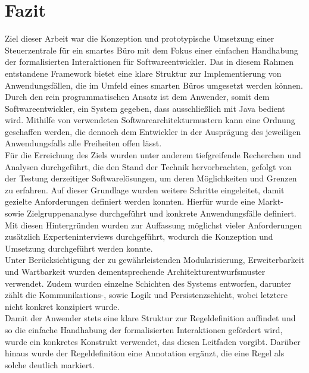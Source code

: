\chapter{Fazit}
\label{chap:fazit}
    Ziel dieser Arbeit war die Konzeption und prototypische Umsetzung einer Steuerzentrale für ein 
    smartes Büro mit dem Fokus einer einfachen Handhabung der formalisierten Interaktionen für Softwareentwickler. 
    Das in diesem Rahmen entstandene Framework bietet eine klare Struktur zur Implementierung von Anwendungsfällen, die 
    im Umfeld eines smarten Büros umgesetzt werden können. Durch den rein programmatischen Ansatz ist dem Anwender, somit 
    dem Softwareentwickler, ein System gegeben, dass ausschließlich mit Java bedient wird. Mithilfe von verwendeten 
    Softwarearchitekturmustern kann eine Ordnung geschaffen werden, die dennoch dem Entwickler in der 
    Ausprägung des jeweiligen Anwendungsfalls alle Freiheiten offen lässt. 
    \\
    \linebreak 
    Für die Erreichung des Ziels wurden unter anderem tiefgreifende Recherchen und Analysen durchgeführt, die den Stand 
    der Technik hervorbrachten, gefolgt von der Testung derzeitiger Softwarelösungen, um deren Möglichkeiten und Grenzen zu erfahren. 
    Auf dieser Grundlage wurden weitere Schritte eingeleitet, damit gezielte Anforderungen definiert werden konnten. Hierfür wurde 
    eine Markt- sowie Zielgruppenanalyse durchgeführt und konkrete Anwendungsfälle definiert. Mit diesen Hintergründen wurden zur 
    Auffassung möglichst vieler Anforderungen zusätzlich Experteninterviews durchgeführt, wodurch die Konzeption und Umsetzung 
    durchgeführt werden konnte. 
    \\
    \linebreak
    Unter Berücksichtigung der zu gewährleistenden Modularisierung, Erweiterbarkeit und Wartbarkeit wurden dementsprechende 
    Architekturentwurfsmuster verwendet. Zudem wurden einzelne Schichten des Systems entworfen, darunter zählt die Kommunikations-, sowie 
    Logik und Persistenzschicht, wobei letztere nicht konkret konzipiert wurde.     
    \\
    Damit der Anwender stets eine klare Struktur zur Regeldefinition auffindet und so die einfache Handhabung der formalisierten Interaktionen gefördert wird, wurde 
    ein konkretes Konstrukt verwendet, das diesen Leitfaden vorgibt. Darüber hinaus wurde der Regeldefinition eine Annotation ergänzt, die eine Regel als solche 
    deutlich markiert.
    \\
